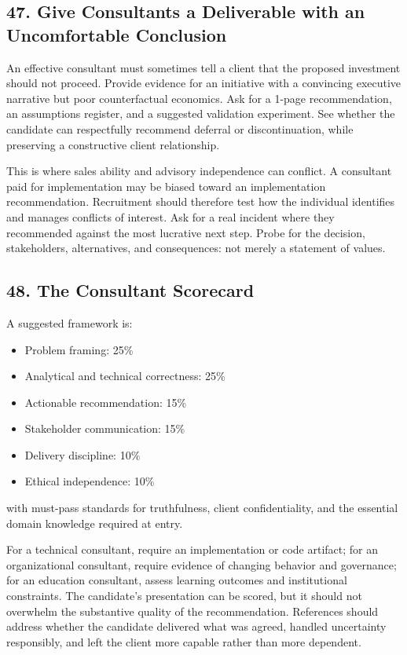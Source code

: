 \subsection*{47. Give Consultants a Deliverable with an Uncomfortable Conclusion}

An effective consultant must sometimes tell a client that the proposed investment should not proceed. Provide evidence for an initiative with a convincing executive narrative but poor counterfactual economics. Ask for a 1-page recommendation, an assumptions register, and a suggested validation experiment. See whether the candidate can respectfully recommend deferral or discontinuation, while preserving a constructive client relationship.

This is where sales ability and advisory independence can conflict. A consultant paid for implementation may be biased toward an implementation recommendation. Recruitment should therefore test how the individual identifies and manages conflicts of interest. Ask for a real incident where they recommended against the most lucrative next step. Probe for the decision, stakeholders, alternatives, and consequences: not merely a statement of values.

\subsection*{48. The Consultant Scorecard}

A suggested framework is:
\begin{itemize}[leftmargin=*]
\item Problem framing: 25\%
\item Analytical and technical correctness: 25\%
\item Actionable recommendation: 15\%
\item Stakeholder communication: 15\%
\item Delivery discipline: 10\%
\item Ethical independence: 10\%
\end{itemize}
with must-pass standards for truthfulness, client confidentiality, and the essential domain knowledge required at entry.

For a technical consultant, require an implementation or code artifact; for an organizational consultant, require evidence of changing behavior and governance; for an education consultant, assess learning outcomes and institutional constraints. The candidate's presentation can be scored, but it should not overwhelm the substantive quality of the recommendation. References should address whether the candidate delivered what was agreed, handled uncertainty responsibly, and left the client more capable rather than more dependent.

